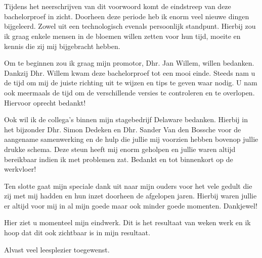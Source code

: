 
\chapter*{}%
\label{ch:voorwoord}

Tijdens het neerschrijven van dit voorwoord komt de eindstreep van deze bachelorproef in zicht. Doorheen deze periode heb ik enorm veel nieuwe dingen bijgeleerd. Zowel uit een technologisch evenals persoonlijk standpunt. Hierbij zou ik graag enkele mensen in de bloemen willen zetten voor hun tijd, moeite en kennis die zij mij bijgebracht hebben.

Om te beginnen zou ik graag mijn promotor, Dhr. Jan Willem, willen bedanken. Dankzij Dhr. Willem kwam deze bachelorproef tot een mooi einde. Steeds nam u de tijd om mij de juiste richting uit te wijzen en tips te geven waar nodig. U nam ook meermaals de tijd om de verschillende versies te controleren en te overlopen. Hiervoor oprecht bedankt!

Ook wil ik de collega's binnen mijn stagebedrijf Delaware bedanken. Hierbij in het bijzonder Dhr. Simon Dedeken en Dhr. Sander Van den Bossche voor de aangename samenwerking en de hulp die jullie mij voorzien hebben bovenop jullie drukke schema. Deze steun heeft mij enorm geholpen en jullie waren altijd bereikbaar indien ik met problemen zat. Bedankt en tot binnenkort op de werkvloer!

Ten slotte gaat mijn speciale dank uit naar mijn ouders voor het vele gedult die zij met mij hadden en hun inzet doorheen de afgelopen jaren. Hierbij waren jullie er altijd voor mij in al mijn goede maar ook minder goede momenten. Dankjewel!

Hier ziet u momenteel mijn eindwerk. Dit is het resultaat van weken werk en ik hoop dat dit ook zichtbaar is in mijn resultaat.

Alvast veel leesplezier toegewenst.


